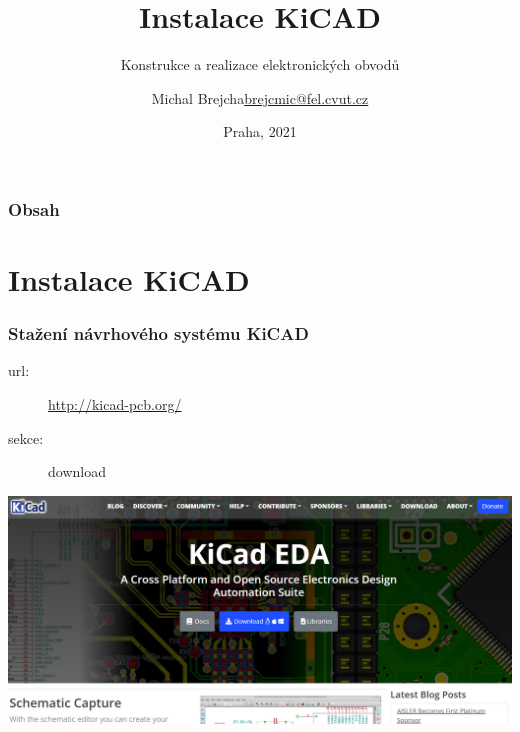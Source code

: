 \documentclass{beamer}
\title[Instalace KiCAD]{Instalace KiCAD}
\subtitle[KEO] {Konstrukce a realizace elektronických obvodů}
\author[Brejcha]{\texorpdfstring{Michal Brejcha\newline\url{brejcmic@fel.cvut.cz}}{Michal Brejcha}}
\institute[CVUT]{ČVUT v Praze, FEL}
\date[Praha, 2021]{Praha, 2021}
\begin{document}
\frame{\titlepage}

\begin{frame}
\frametitle{Obsah} 
\tableofcontents
\end{frame}


\section{\texorpdfstring{Instalace KiCAD}{Instalace Kicad}}
	\begin{frame}
    \frametitle{Stažení návrhového systému KiCAD}
		
		\begin{description}
			\item[url:] \url{http://kicad-pcb.org/}
			\item[sekce:] download
		\end{description}
		
		\begin{center}
			\includegraphics[scale=0.3]{obr/kicad_url.png}
		\end{center}
	\end{frame}
\end{document}
